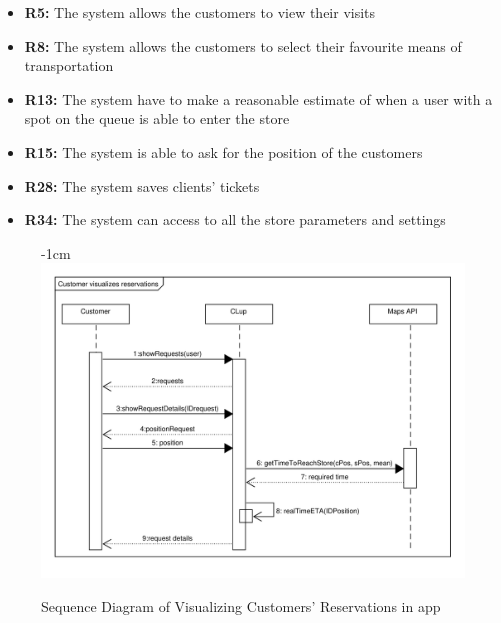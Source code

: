 \documentclass{article}
\begin{document}
\begin{center}
\newpage
\begin{itemize}
					\bigskip
					\bigskip
					\bigskip
					 {\bfseries Required functional requirements: }


					\item {\bfseries R5: }  The system allows the customers to view their visits
					\item {\bfseries R8: }  The system allows the customers to select their favourite means of transportation
					\item {\bfseries R13: }  The system have to make a reasonable estimate of when a user with a spot on the queue is able to enter the store
					\item {\bfseries R15: } The system is able to ask for the position of the customers
					\item {\bfseries R28: } The system saves clients' tickets
					\item {\bfseries R34: } The system can access to all the store parameters and settings
					
					\end{itemize}
				\end{center}
												\begin{figure}
								\begin{adjustwidth} {-1cm}{}
									\centering
									\includegraphics[scale=0.65]{SD/6_visualizeReservation.pdf}\\
									\caption{Sequence Diagram of Visualizing Customers' Reservations in app}
								\end{adjustwidth}
							\end{figure}
			\newpage
\end{document}
